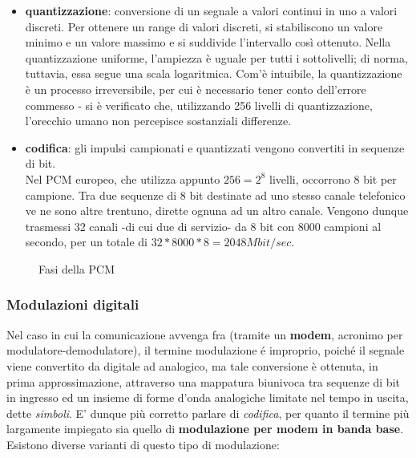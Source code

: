 \documentclass[a4paper,11pt]{article}
\def\subsub#1{\subsubsection{#1}\label{#1}}
\def\vedi#1{\nameref{#1}}
\begin{document}
\begin{itemize}
\begin{itemize}
\item \textbf{quantizzazione}: conversione di un segnale a valori continui in uno a valori discreti. Per ottenere un range di valori discreti, si stabiliscono un valore minimo e un valore massimo e si suddivide l'intervallo così ottenuto. Nella quantizzazione uniforme, l'ampiezza è uguale per tutti i sottolivelli; di norma, tuttavia, essa segue una scala logaritmica. Com'è intuibile, la quantizzazione è un processo irreversibile, per cui è necessario tener conto dell'errore commesso - si è verificato che, utilizzando 256 livelli di quantizzazione, l'orecchio umano non percepisce sostanziali differenze.
\item \textbf{codifica}: gli impulsi campionati e quantizzati vengono convertiti in sequenze di bit. 
\\Nel PCM europeo, che utilizza appunto $256=2^{8}$ livelli, occorrono 8 bit per campione. Tra due sequenze di 8 bit destinate ad uno stesso canale telefonico ve ne sono altre trentuno, dirette ognuna ad un altro canale. Vengono dunque trasmessi 32 canali -di cui due di servizio- da 8 bit con 8000 campioni al secondo, per un totale di $32*8000*8=2048 Mbit/sec$. %
\end{itemize}
\begin{figure}[h]
\centering
{}
\caption{Fasi della PCM}
\label{fig. 4}
\end{figure}
\end{itemize}
\subsub{Modulazioni digitali}
Nel caso in cui la comunicazione avvenga fra \vedi{DTE} (tramite un \textbf{modem}, acronimo per modulatore-demodulatore), il termine modulazione é improprio, poiché il segnale viene convertito da digitale ad analogico, ma tale conversione è ottenuta, in prima approssimazione, attraverso una mappatura biunivoca tra sequenze di bit in ingresso ed un insieme di forme d'onda analogiche limitate nel tempo in uscita, dette \textit{simboli}. E' dunque più corretto parlare di \textit{codifica}, per quanto il termine più largamente impiegato sia quello di \textbf{modulazione per modem in banda base}. Esistono diverse varianti di questo tipo di modulazione:
\end{document}
